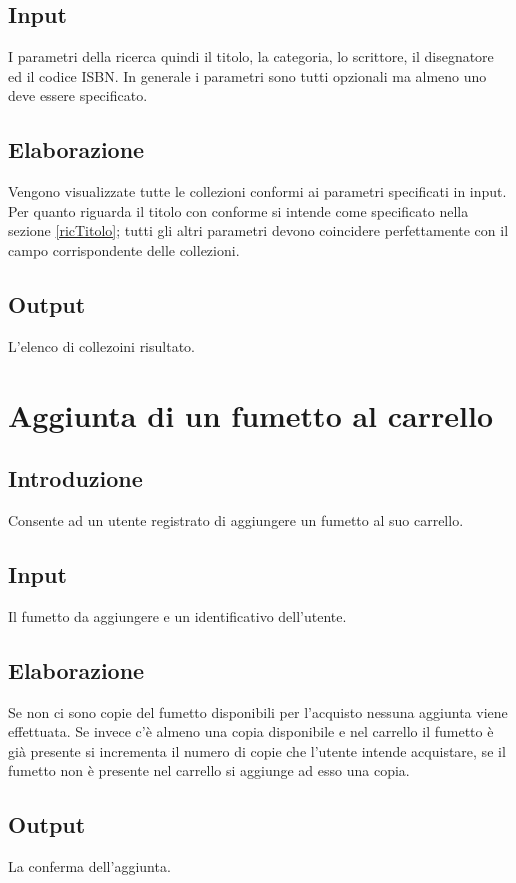 \documentclass{scrreprt}
\begin{document}
\subsection*{Input}
I parametri della ricerca quindi il titolo, la categoria, lo scrittore, il disegnatore ed il codice ISBN.
In generale i parametri sono tutti opzionali ma almeno uno deve essere specificato.
\subsection*{Elaborazione}
Vengono visualizzate tutte le collezioni conformi ai parametri specificati in input. Per quanto riguarda
il titolo con conforme si intende come specificato nella sezione \ref*{ricTitolo}; tutti gli altri parametri
devono coincidere perfettamente con il campo corrispondente delle collezioni.
\subsection*{Output}
L'elenco di collezoini risultato.

\section{Aggiunta di un fumetto al carrello}

\subsection*{Introduzione}
Consente ad un utente registrato di aggiungere un fumetto al suo carrello.
\subsection*{Input}
Il fumetto da aggiungere e un identificativo dell'utente.
\subsection*{Elaborazione}
Se non ci sono copie del fumetto disponibili per l'acquisto nessuna aggiunta viene effettuata.
Se invece c'è almeno una copia disponibile e nel carrello il fumetto è già presente si incrementa
il numero di copie che l'utente intende acquistare, se il fumetto non è presente nel carrello si
aggiunge ad esso una copia.
\subsection*{Output}
La conferma dell'aggiunta.
\end{document}
